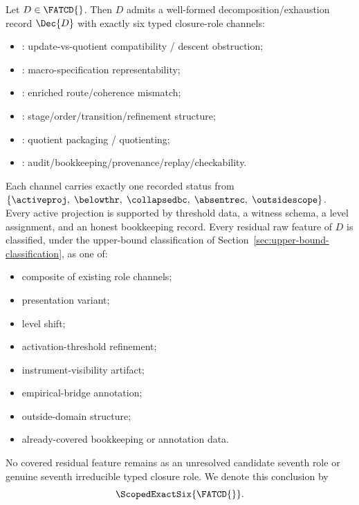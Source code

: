 \begin{theorem}\label{thm:scoped-exact-six}
Let \(D \in \FATCD{}\). Then \(D\) admits a well-formed
decomposition/exhaustion record \(\Dec{D}\) with exactly six typed
closure-role channels:
\begin{itemize}[topsep=2pt,itemsep=1pt]
  \item \Pone{}: update-vs-quotient compatibility / descent obstruction;
  \item \Ptwo{}: macro-specification representability;
  \item \Pthree{}: enriched route/coherence mismatch;
  \item \Pfour{}: stage/order/transition/refinement structure;
  \item \Pfive{}: quotient packaging / quotienting;
  \item \Psix{}: audit/bookkeeping/provenance/replay/checkability.
\end{itemize}
Each channel carries exactly one recorded status from
\(\{\activeproj,\; \belowthr,\; \collapsedbc,\; \absentrec,\;
\outsidescope\}\). Every active projection is supported by threshold
data, a witness schema, a level assignment, and an honest bookkeeping
record. Every residual raw feature of \(D\) is classified, under the
upper-bound classification of
Section~\ref{sec:upper-bound-classification}, as one of:
\begin{itemize}[topsep=2pt,itemsep=1pt]
  \item composite of existing role channels;
  \item presentation variant;
  \item level shift;
  \item activation-threshold refinement;
  \item instrument-visibility artifact;
  \item empirical-bridge annotation;
  \item outside-domain structure;
  \item already-covered bookkeeping or annotation data.
\end{itemize}
No covered residual feature remains as an unresolved candidate seventh
role or genuine seventh irreducible typed closure role. We denote this
conclusion by
\[
\ScopedExactSix{\FATCD{}}.
\]
\end{theorem}

